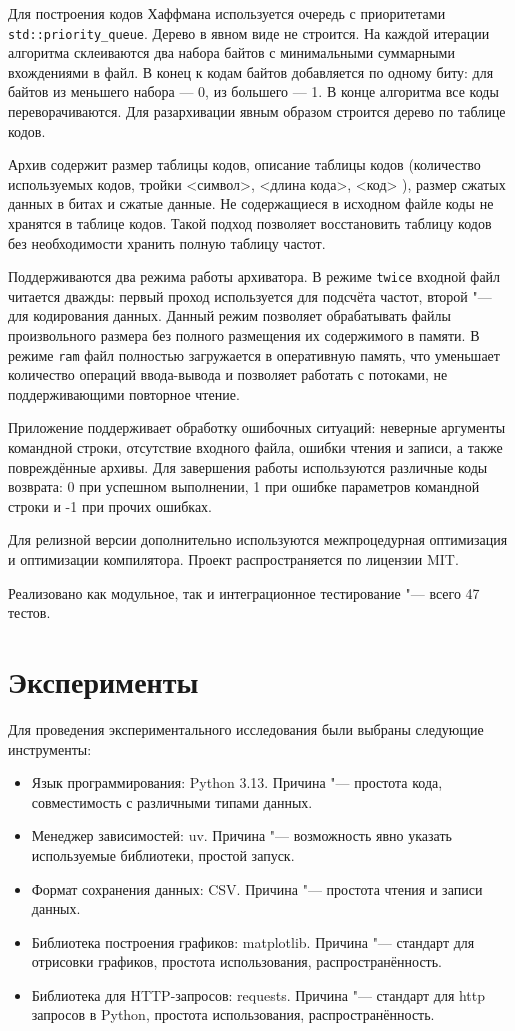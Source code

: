 \documentclass[a4paper]{article}
\begin{document}
Для построения кодов Хаффмана используется очередь с приоритетами \texttt{std::priority\_queue}. Дерево в явном виде не строится. На каждой итерации алгоритма склеиваются два набора байтов с минимальными суммарными вхождениями в файл. В конец к кодам байтов добавляется по одному биту: для байтов из меньшего набора --- 0, из большего --- 1. В конце алгоритма все коды переворачиваются.
Для разархивации явным образом строится дерево по таблице кодов.

Архив содержит размер таблицы кодов, описание таблицы кодов (количество используемых кодов, тройки <символ>, <длина кода>, <код> ), размер сжатых данных в битах и сжатые данные. Не содержащиеся в исходном файле коды не хранятся в таблице кодов. Такой подход позволяет восстановить таблицу кодов без необходимости хранить полную таблицу частот.

Поддерживаются два режима работы архиватора. В режиме \texttt{twice} входной файл читается дважды: первый проход используется для подсчёта частот, второй "--- для кодирования данных. Данный режим позволяет обрабатывать файлы произвольного размера без полного размещения их содержимого в памяти. В режиме \texttt{ram} файл полностью загружается в оперативную память, что уменьшает количество операций ввода-вывода и позволяет работать с потоками, не поддерживающими повторное чтение.

Приложение поддерживает обработку ошибочных ситуаций: неверные аргументы командной строки, отсутствие входного файла, ошибки чтения и записи, а также повреждённые архивы. Для завершения работы используются различные коды возврата: 0 при успешном выполнении, 1 при ошибке параметров командной строки и -1 при прочих ошибках.

Для релизной версии дополнительно используются межпроцедурная оптимизация и оптимизации компилятора. Проект распространяется по лицензии MIT.

Реализовано как модульное, так и интеграционное тестирование "--- всего 47 тестов.

\section{Эксперименты}

Для проведения экспериментального исследования были выбраны следующие инструменты:
\begin{itemize}
    \item Язык программирования: Python 3.13. Причина "--- простота кода, совместимость с различными типами данных.
    \item Менеджер зависимостей: uv. Причина "--- возможность явно указать используемые библиотеки, простой запуск.
    \item Формат сохранения данных: CSV. Причина "--- простота чтения и записи данных.
    \item Библиотека построения графиков: matplotlib. Причина "--- стандарт для отрисовки графиков, простота использования, распространённость.
    \item Библиотека для HTTP-запросов: requests. Причина "--- стандарт для http запросов в Python, простота использования, распространённость.
\end{itemize}
\end{document}
